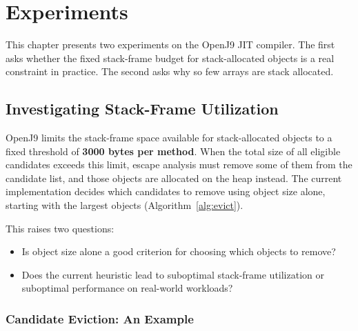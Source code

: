 \chapter{Experiments}
\label{ch:experiments}

This chapter presents two experiments on the OpenJ9 JIT compiler. The first asks whether the
fixed stack-frame budget for stack-allocated objects is a real constraint in practice. The
second asks why so few arrays are stack allocated.

\section{Investigating Stack-Frame Utilization}

OpenJ9 limits the stack-frame space available for stack-allocated objects to a fixed threshold
of \textbf{3000 bytes per method}. When the total size of all eligible candidates exceeds this
limit, escape analysis must remove some of them from the candidate list, and those objects are
allocated on the heap instead. The current implementation decides which candidates to remove
using object size alone, starting with the largest objects (Algorithm~\ref{alg:evict}).

\begin{algorithm}[htbp]
  \caption{Candidate eviction in OpenJ9 (size-based)}
  \label{alg:evict}
\end{algorithm}

This raises two questions:
\begin{itemize}
  \item Is object size alone a good criterion for choosing which objects to remove?
  \item Does the current heuristic lead to suboptimal stack-frame utilization or suboptimal
        performance on real-world workloads?
\end{itemize}

\subsection{Candidate Eviction: An Example}

